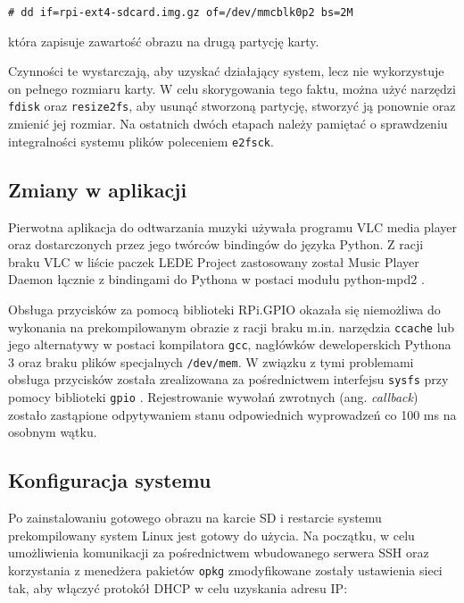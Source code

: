 \documentclass[10pt,a4paper]{article}
\begin{document}
\begin{lstlisting}
# dd if=rpi-ext4-sdcard.img.gz of=/dev/mmcblk0p2 bs=2M
\end{lstlisting}

która zapisuje zawartość obrazu na drugą partycję karty.

Czynności te wystarczają, aby uzyskać działający system, lecz nie wykorzystuje on pełnego rozmiaru
karty. W celu skorygowania tego faktu, można użyć narzędzi \texttt{fdisk} oraz \texttt{resize2fs},
aby usunąć stworzoną partycję, stworzyć ją ponownie oraz zmienić jej rozmiar. Na ostatnich dwóch
etapach należy pamiętać o sprawdzeniu integralności systemu plików poleceniem \texttt{e2fsck}.

\subsection{Zmiany w aplikacji}

Pierwotna aplikacja do odtwarzania muzyki używała programu VLC media player oraz dostarczonych
przez jego twórców bindingów do języka Python. Z racji braku VLC w liście paczek LEDE Project
zastosowany został Music Player Daemon \cite{mpd} łącznie z bindingami do Pythona w postaci
modułu python-mpd2 \cite{python-mpd2}.

Obsługa przycisków za pomocą biblioteki RPi.GPIO okazała się niemożliwa do wykonania
na prekompilowanym obrazie z racji braku m.in. narzędzia \texttt{ccache} lub jego alternatywy
w postaci kompilatora \texttt{gcc}, nagłówków deweloperskich Pythona 3 oraz braku plików
specjalnych \texttt{/dev/mem}. W związku z tymi problemami obsługa przycisków została zrealizowana
za pośrednictwem interfejsu \texttt{sysfs} przy pomocy biblioteki \texttt{gpio} \cite{gpio}.
Rejestrowanie wywołań zwrotnych (ang. \emph{callback}) zostało zastąpione odpytywaniem stanu
odpowiednich wyprowadzeń co 100 ms na osobnym wątku.

\subsection{Konfiguracja systemu}

Po zainstalowaniu gotowego obrazu na karcie SD i restarcie systemu prekompilowany system Linux
jest gotowy do użycia. Na początku, w celu umożliwienia komunikacji za pośrednictwem wbudowanego
serwera SSH oraz korzystania z menedżera pakietów \texttt{opkg} zmodyfikowane zostały ustawienia
sieci tak, aby włączyć protokół DHCP w celu uzyskania adresu IP:
\end{document}
